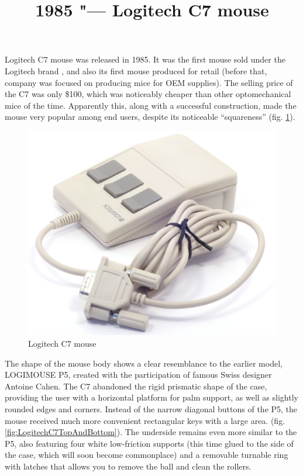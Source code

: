 \documentclass[11pt, a4paper]{article}
\begin{document}
\title{1985 "--- Logitech C7 mouse}
\date{}
\maketitle
{}
Logitech C7 mouse was released in 1985. It was the first mouse sold under the Logitech brand \cite{timeline}, and also its first mouse produced for retail (before that, company was focused on producing mice for OEM supplies).
The selling price of the C7 was only \$100, which was noticeably cheaper than other optomechanical mice of the time. Apparently this, along with a successful construction, made the mouse very popular among end users, despite its noticeable “squareness” (fig. \ref{fig:LogitechC7Pic}).

\begin{figure}[h]
   \centering
    \includegraphics[scale=0.5]{1985_logitech_c7_mouse/pic_60.jpg}
    \caption{Logitech C7 mouse}
    \label{fig:LogitechC7Pic}
\end{figure}

The shape of the mouse body shows a clear resemblance to the earlier model, LOGIMOUSE P5, created with the participation of famous Swiss designer Antoine Cahen. The C7 abandoned the rigid prismatic shape of the case, providing the user with a horizontal platform for palm support, as well as slightly rounded edges and corners. Instead of the narrow diagonal buttons of the P5, the mouse received much more convenient rectangular keys with a large area. (fig. \ref{fig:LogitechC7TopAndBottom}). The underside remains even more similar to the P5, also featuring four white low-friction supports (this time glued to the side of the case, which will soon become commonplace) and a removable turnable ring with latches that allows you to remove the ball and clean the rollers.
\end{document}
